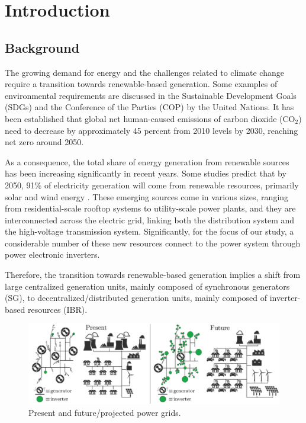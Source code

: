 \chapter{Introduction}\label{chap:introduction}
\section{Background}

The growing demand for energy and the challenges related to climate change
require a transition towards renewable-based generation. Some examples of
environmental requirements are discussed in the Sustainable Development Goals
(SDGs) \cite{sdgs} and the Conference of the Parties (COP) \cite{COP} by the
United Nations. It has been established that global net human-caused emissions
of carbon dioxide ($\text{CO}_2$) need to decrease by approximately 45 percent
from 2010 levels by 2030, reaching net zero around 2050.

As a consequence, the total share of energy generation from renewable sources
has been increasing significantly in recent years. Some studies predict that by
2050, 91\% of electricity generation will come from renewable resources,
primarily solar and wind energy \cite{irena}. These emerging sources come in
various sizes, ranging from residential-scale rooftop systems to utility-scale
power plants, and they are interconnected across the electric grid, linking both
the distribution system and the high-voltage transmission system. Significantly,
for the focus of our study, a considerable number of these new resources connect
to the power system through power electronic inverters\cite{osti}.

Therefore, the transition towards renewable-based generation implies a shift
from large centralized generation units, mainly composed of synchronous
generators (SG), to decentralized/distributed generation units, mainly composed
of inverter-based resources (IBR).

\begin{figure}[h!]
    \centering
    \includegraphics[width=14cm]{images/future_grid.png}
    \caption{Present and future/projected power grids\cite{osti}.}
    \label{fig:future_grid}
\end{figure}

